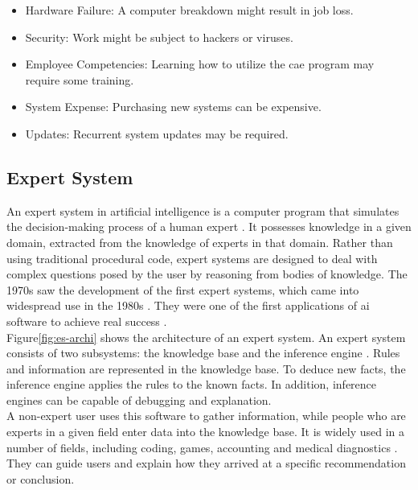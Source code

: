     \begin{itemize}
        \item Hardware Failure: A computer breakdown might result in job loss.
        \item Security: Work might be subject to hackers or viruses.
        \item Employee Competencies: Learning how to utilize the \acrshort{cae} program may require some training.
        \item System Expense: Purchasing new systems can be expensive.
        \item Updates: Recurrent system updates may be required.
    \end{itemize}

\subsection{Expert System\label{subsec:exp-sys}}
An expert system in artificial intelligence is a computer program that simulates the decision-making process of a human expert \cite{liao2005expert, waterman1985guide}. It possesses knowledge in a given domain, extracted from the knowledge of experts in that domain.  Rather than using traditional procedural code, expert systems are designed to deal with complex questions posed by the user by reasoning from bodies of knowledge. The 1970s saw the development of the first expert systems, which came into widespread use in the 1980s \cite{buchanan1988fundamentals}. They were one of the first applications of \acrfull{ai} software to achieve real success \cite{buckley1986fuzzy, buchanan1988fundamentals, waterman1985guide}. \\

Figure\ref{fig:es-archi} shows the architecture of an expert system. An expert system consists of two subsystems: the knowledge base and the inference engine \cite{tripathi2011review}. Rules and information are represented in the knowledge base. To deduce new facts, the inference engine applies the rules to the known facts. In addition, inference engines can be capable of debugging and explanation.\\

A non-expert user uses this software to gather information, while people who are experts in a given field enter data into the knowledge base. It is widely used in a number of fields, including coding, games, accounting and medical diagnostics \cite{liao2005expert}. They can guide users and explain how they arrived at a specific recommendation or conclusion.\\

